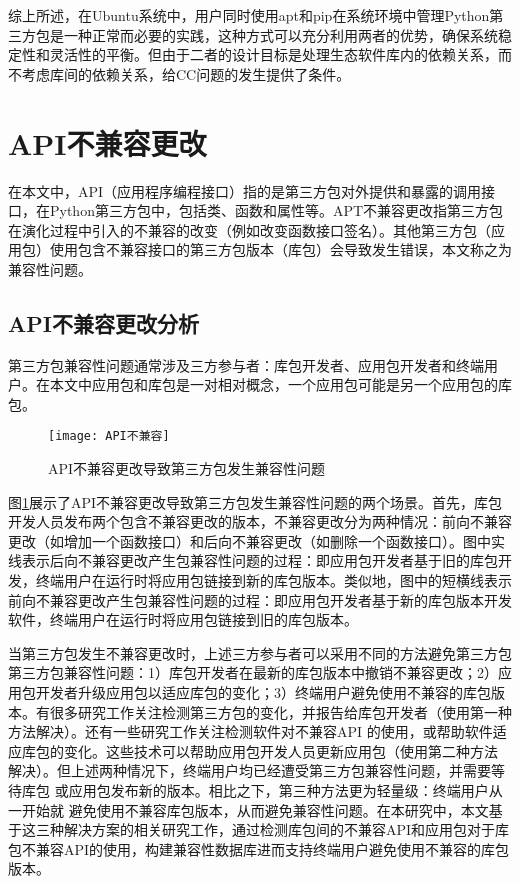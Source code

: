 综上所述，在Ubuntu系统中，用户同时使用apt和pip在系统环境中管理Python第三方包是一种正常而必要的实践，这种方式可以充分利用两者的优势，确保系统稳定性和灵活性的平衡。但由于二者的设计目标是处理生态软件库内的依赖关系，而不考虑库间的依赖关系，给CC问题的发生提供了条件。

\section{API不兼容更改}
在本文中，API（应用程序编程接口）指的是第三方包对外提供和暴露的调用接口，在Python第三方包中，包括类、函数和属性等。APT不兼容更改指第三方包在演化过程中引入的不兼容的改变（例如改变函数接口签名）。其他第三方包（应用包）使用包含不兼容接口的第三方包版本（库包）会导致发生错误，本文称之为兼容性问题。

\subsection{API不兼容更改分析}
第三方包兼容性问题通常涉及三方参与者：库包开发者、应用包开发者和终端用户。在本文中应用包和库包是一对相对概念，一个应用包可能是另一个应用包的库包。
\begin{figure}[htbp] %
	\centering
	\texttt{[image: API不兼容]}
	\caption{API不兼容更改导致第三方包发生兼容性问题}
	\label{fig:API}
\end{figure}
图\ref{fig:API}展示了API不兼容更改导致第三方包发生兼容性问题的两个场景。首先，库包开发人员发布两个包含不兼容更改的版本，不兼容更改分为两种情况：前向不兼容更改（如增加一个函数接口）和后向不兼容更改（如删除一个函数接口）。图中实线表示后向不兼容更改产生包兼容性问题的过程：即应用包开发者基于旧的库包开发，终端用户在运行时将应用包链接到新的库包版本。类似地，图中的短横线表示前向不兼容更改产生包兼容性问题的过程：即应用包开发者基于新的库包版本开发软件，终端用户在运行时将应用包链接到旧的库包版本。

当第三方包发生不兼容更改时，上述三方参与者可以采用不同的方法避免第三方包第三方包兼容性问题：1）库包开发者在最新的库包版本中撤销不兼容更改；2）应用包开发者升级应用包以适应库包的变化；3）终端用户避免使用不兼容的库包版本。有很多研究工作关注检测第三方包的变化，并报告给库包开发者（使用第一种方法解决）。还有一些研究工作关注检测软件对不兼容API 的使用，或帮助软件适应库包的变化。这些技术可以帮助应用包开发人员更新应用包（使用第二种方法
解决）。但上述两种情况下，终端用户均已经遭受第三方包兼容性问题，并需要等待库包
或应用包发布新的版本。相比之下，第三种方法更为轻量级：终端用户从一开始就
避免使用不兼容库包版本，从而避免兼容性问题。在本研究中，本文基于这三种解决方案的相关研究工作，通过检测库包间的不兼容API和应用包对于库包不兼容API的使用，构建兼容性数据库进而支持终端用户避免使用不兼容的库包版本。

